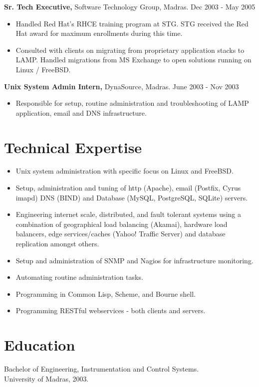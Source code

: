 \documentclass[margin]{res}
\begin{document}
\begin{resume}
\begin{itemize}
 \end{itemize}

{\bf Sr. Tech Executive,} Software Technology Group, Madras. \hfill Dec 2003 - May 2005
 \begin{itemize} \itemsep -2pt
 \item Handled Red Hat's RHCE training program at STG. STG received the Red Hat
   award for maximum enrollments during this time.
 \item Consulted with clients on migrating from proprietary application stacks
   to LAMP. Handled migrations from MS Exchange to open solutions running on 
   Linux / FreeBSD.
   
 \end{itemize}

{\bf Unix System Admin Intern,} DynaSource, Madras. \hfill June 2003 - Nov 2003
 \begin{itemize} \itemsep -2pt
 \item Responsible for setup, routine administration and troubleshooting 
   of LAMP \\ application, email and DNS infrastructure.
   
 \end{itemize}

\section{Technical Expertise} 
 \begin{itemize} \itemsep -2pt
 \item Unix system administration with specific focus on Linux and FreeBSD.
 \item Setup, administration and tuning of http (Apache), email (Postfix, Cyrus imapd)
   DNS (BIND) and Database (MySQL, PostgreSQL, SQLite) servers.
 \item Engineering internet scale, distributed, and fault tolerant systems 
   using a combination of geographical load balancing (Akamai), hardware load 
   balancers, edge services/caches (Yahoo! Traffic Server) and database replication 
   amongst others.
 \item Setup and administration of SNMP and Nagios for infrastructure monitoring.
 \item Automating routine administration tasks.
 \item Programming in Common Lisp, Scheme, and Bourne shell.
 \item Programming RESTful webservices - both clients and servers.
   
 \end{itemize}

\section{Education} 
Bachelor of Engineering, Instrumentation and Control Systems.\\
University of Madras, 2003.


\end{resume} 
\end{document}
